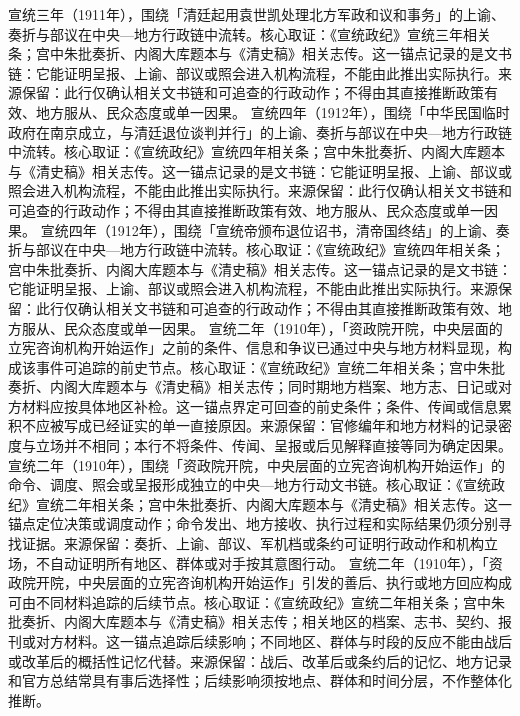 宣统三年（1911年），围绕「清廷起用袁世凯处理北方军政和议和事务」的上谕、奏折与部议在中央—地方行政链中流转。核心取证：《宣统政纪》宣统三年相关条；宫中朱批奏折、内阁大库题本与《清史稿》相关志传。这一锚点记录的是文书链：它能证明呈报、上谕、部议或照会进入机构流程，不能由此推出实际执行。来源保留：此行仅确认相关文书链和可追查的行政动作；不得由其直接推断政策有效、地方服从、民众态度或单一因果。
宣统四年（1912年），围绕「中华民国临时政府在南京成立，与清廷退位谈判并行」的上谕、奏折与部议在中央—地方行政链中流转。核心取证：《宣统政纪》宣统四年相关条；宫中朱批奏折、内阁大库题本与《清史稿》相关志传。这一锚点记录的是文书链：它能证明呈报、上谕、部议或照会进入机构流程，不能由此推出实际执行。来源保留：此行仅确认相关文书链和可追查的行政动作；不得由其直接推断政策有效、地方服从、民众态度或单一因果。
宣统四年（1912年），围绕「宣统帝颁布退位诏书，清帝国终结」的上谕、奏折与部议在中央—地方行政链中流转。核心取证：《宣统政纪》宣统四年相关条；宫中朱批奏折、内阁大库题本与《清史稿》相关志传。这一锚点记录的是文书链：它能证明呈报、上谕、部议或照会进入机构流程，不能由此推出实际执行。来源保留：此行仅确认相关文书链和可追查的行政动作；不得由其直接推断政策有效、地方服从、民众态度或单一因果。
宣统二年（1910年），「资政院开院，中央层面的立宪咨询机构开始运作」之前的条件、信息和争议已通过中央与地方材料显现，构成该事件可追踪的前史节点。核心取证：《宣统政纪》宣统二年相关条；宫中朱批奏折、内阁大库题本与《清史稿》相关志传；同时期地方档案、地方志、日记或对方材料应按具体地区补检。这一锚点界定可回查的前史条件；条件、传闻或信息累积不应被写成已经证实的单一直接原因。来源保留：官修编年和地方材料的记录密度与立场并不相同；本行不将条件、传闻、呈报或后见解释直接等同为确定因果。
宣统二年（1910年），围绕「资政院开院，中央层面的立宪咨询机构开始运作」的命令、调度、照会或呈报形成独立的中央—地方行动文书链。核心取证：《宣统政纪》宣统二年相关条；宫中朱批奏折、内阁大库题本与《清史稿》相关志传。这一锚点定位决策或调度动作；命令发出、地方接收、执行过程和实际结果仍须分别寻找证据。来源保留：奏折、上谕、部议、军机档或条约可证明行政动作和机构立场，不自动证明所有地区、群体或对手按其意图行动。
宣统二年（1910年），「资政院开院，中央层面的立宪咨询机构开始运作」引发的善后、执行或地方回应构成可由不同材料追踪的后续节点。核心取证：《宣统政纪》宣统二年相关条；宫中朱批奏折、内阁大库题本与《清史稿》相关志传；相关地区的档案、志书、契约、报刊或对方材料。这一锚点追踪后续影响；不同地区、群体与时段的反应不能由战后或改革后的概括性记忆代替。来源保留：战后、改革后或条约后的记忆、地方记录和官方总结常具有事后选择性；后续影响须按地点、群体和时间分层，不作整体化推断。

